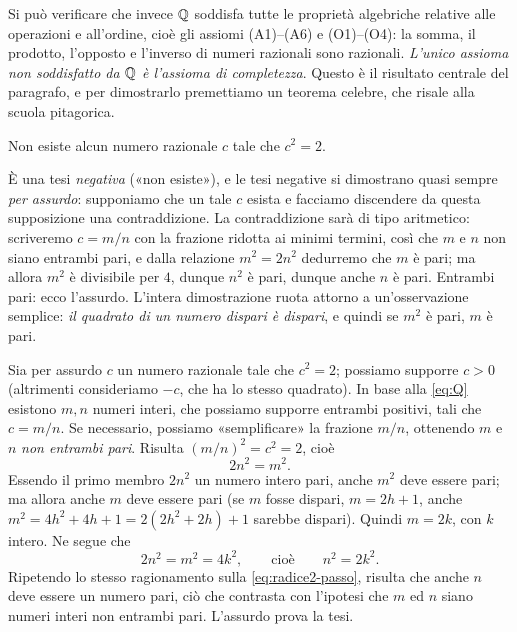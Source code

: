 Si può verificare che invece $\mathbb{Q}$ soddisfa tutte le proprietà algebriche relative alle
operazioni e all'ordine, cioè gli assiomi (A1)--(A6) e (O1)--(O4): la somma, il
prodotto, l'opposto e l'inverso di numeri razionali sono razionali. \emph{L'unico assioma
non soddisfatto da $\mathbb{Q}$ è l'assioma di completezza}. Questo è il risultato centrale del
paragrafo, e per dimostrarlo premettiamo un teorema celebre, che risale alla scuola
pitagorica.

\begin{teorema}\label{teo:radice2}
Non esiste alcun numero razionale $c$ tale che $c^{2}=2$.
\end{teorema}

\begin{schema}
\end{schema}

\begin{strategia}
È una tesi \emph{negativa} («non esiste»), e le tesi negative si dimostrano quasi
sempre \emph{per assurdo}: supponiamo che un tale $c$ esista e facciamo discendere da
questa supposizione una contraddizione. La contraddizione sarà di tipo aritmetico:
scriveremo $c=m/n$ con la frazione ridotta ai minimi termini, così che $m$ e $n$ non
siano entrambi pari, e dalla relazione $m^{2}=2n^{2}$ dedurremo che $m$ è pari; ma
allora $m^{2}$ è divisibile per $4$, dunque $n^{2}$ è pari, dunque anche $n$ è pari.
Entrambi pari: ecco l'assurdo. L'intera dimostrazione ruota attorno a un'osservazione
semplice: \emph{il quadrato di un numero dispari è dispari}, e quindi se $m^{2}$ è pari,
$m$ è pari.
\end{strategia}

\begin{dimostrazione}
Sia per assurdo $c$ un numero razionale tale che $c^{2}=2$; possiamo supporre $c>0$
(altrimenti consideriamo $-c$, che ha lo stesso quadrato). In base alla \eqref{eq:Q}
esistono $m,n$ numeri interi, che possiamo supporre entrambi positivi, tali che
$c=m/n$. Se necessario, possiamo «semplificare» la frazione $m/n$, ottenendo $m$ e $n$
\emph{non entrambi pari}. Risulta $(m/n)^{2}=c^{2}=2$, cioè
\[
  2n^{2}=m^{2}.
\]
Essendo il primo membro $2n^{2}$ un numero intero pari, anche $m^{2}$ deve essere pari;
ma allora anche $m$ deve essere pari (se $m$ fosse dispari, $m=2h+1$, anche
$m^{2}=4h^{2}+4h+1=2(2h^{2}+2h)+1$ sarebbe dispari). Quindi $m=2k$, con $k$ intero.
Ne segue che
\begin{equation}\label{eq:radice2-passo}
  2n^{2}=m^{2}=4k^{2}, \qquad\text{cioè}\qquad n^{2}=2k^{2}.
\end{equation}
Ripetendo lo stesso ragionamento sulla \eqref{eq:radice2-passo}, risulta che anche
$n$ deve essere un numero pari, ciò che contrasta con l'ipotesi che $m$ ed $n$ siano
numeri interi non entrambi pari. L'assurdo prova la tesi.
\end{dimostrazione}

